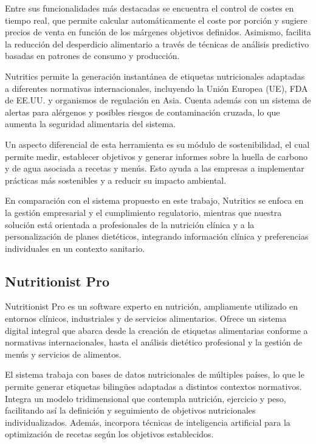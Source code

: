 Entre sus funcionalidades más destacadas se encuentra el control de costes en tiempo real, que permite calcular automáticamente el coste por porción y sugiere precios de venta en función de los márgenes objetivos definidos. Asimismo, facilita la reducción del desperdicio alimentario a través de técnicas de análisis predictivo basadas en patrones de consumo y producción.

Nutritics permite la generación instantánea de etiquetas nutricionales adaptadas a diferentes normativas internacionales, incluyendo la Unión Europea (UE), FDA de EE.UU. y organismos de regulación en Asia. Cuenta además con un sistema de alertas para alérgenos y posibles riesgos de contaminación cruzada, lo que aumenta la seguridad alimentaria del sistema.

Un aspecto diferencial de esta herramienta es su módulo de sostenibilidad, el cual permite medir, establecer objetivos y generar informes sobre la huella de carbono y de agua asociada a recetas y menús. Esto ayuda a las empresas a implementar prácticas más sostenibles y a reducir su impacto ambiental.

En comparación con el sistema propuesto en este trabajo, Nutritics se enfoca en la gestión empresarial y el cumplimiento regulatorio, mientras que nuestra solución está orientada a profesionales de la nutrición clínica y a la personalización de planes dietéticos, integrando información clínica y preferencias individuales en un contexto sanitario.

\subsection{Nutritionist Pro\cite{Nutritionistpro}}
Nutritionist Pro es un software experto en nutrición, ampliamente utilizado en entornos clínicos, industriales y de servicios alimentarios. Ofrece un sistema digital integral que abarca desde la creación de etiquetas alimentarias conforme a normativas internacionales, hasta el análisis dietético profesional y la gestión de menús y servicios de alimentos.

El sistema trabaja con bases de datos nutricionales de múltiples países, lo que le permite generar etiquetas bilingües adaptadas a distintos contextos normativos. Integra un modelo tridimensional que contempla nutrición, ejercicio y peso, facilitando así la definición y seguimiento de objetivos nutricionales individualizados. Además, incorpora técnicas de inteligencia artificial para la optimización de recetas según los objetivos establecidos.

